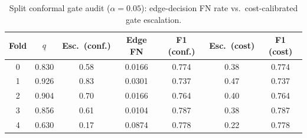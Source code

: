\begin{table}[!t]
\centering
\caption{Split conformal gate audit ($\alpha{=}0.05$): edge-decision FN rate vs.\ cost-calibrated gate escalation.}
\label{tab:conformalgate}
\begin{tabular}{c ccc ccc}
\toprule
Fold & $q_{\hat{}}$ & Esc.\ (conf.) & Edge FN & F1 (conf.) & Esc.\ (cost) & F1 (cost) \\
\midrule
0 & 0.830 & 0.58 & 0.0166 & 0.774 & 0.38 & 0.774 \\
1 & 0.926 & 0.83 & 0.0301 & 0.737 & 0.47 & 0.737 \\
2 & 0.904 & 0.70 & 0.0166 & 0.764 & 0.40 & 0.764 \\
3 & 0.856 & 0.61 & 0.0104 & 0.787 & 0.38 & 0.787 \\
4 & 0.630 & 0.17 & 0.0874 & 0.778 & 0.22 & 0.778 \\
\bottomrule
\end{tabular}
\end{table}
